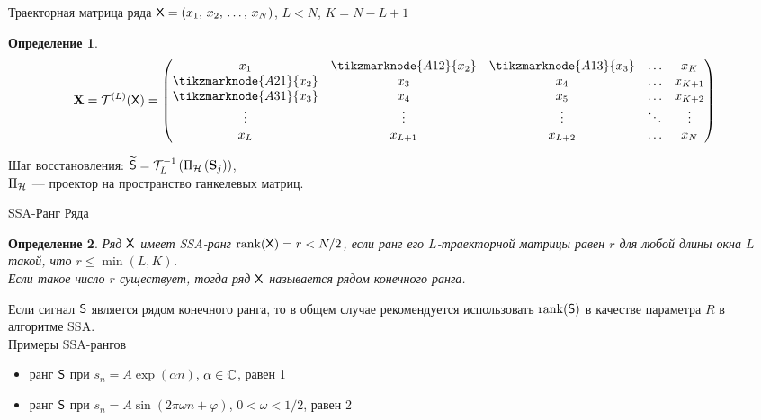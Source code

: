 \documentclass[pdf, unicode, 10pt, notheorems, handout]{beamer}
\newcommand{\rank}{\operatorname{rank}}
\newtheorem{definition}{Определение}
\begin{document}
\begin{frame}{Траекторная матрица ряда}
  $\mathsf{X} = (x_1,\, x_2,\, \dots,\, x_N)$, $L < N$, $K = N - L + 1$
  \vspace{0.4cm}\\
  \begin{definition}
    \[
      \bfX = \calT^{(L)}(\tX) =
      \begin{pmatrix}
        x_1                     & \tikzmarknode{A12}{x_2} &
        \tikzmarknode{A13}{x_3} & \ldots & x_K     \\
        \tikzmarknode{A21}{x_2} & x_3                     & x_4
        & \ldots & x_{K+1} \\
        \tikzmarknode{A31}{x_3} & x_4                     & x_5
        & \ldots & x_{K+2} \\
        \vdots                  & \vdots                  & \vdots
        & \ddots & \vdots  \\
        x_L                     & x_{L+1}                 & x_{L+2}
        & \ldots & x_N
      \end{pmatrix}
    \]
  \end{definition}
  \bigskip

  Шаг восстановления: $\widetilde{\mathsf{S}} =
  \mathcal{T}_L^{-1}\left(\Pi_{\mathcal{H}}\left(\mathbf{S}_j\right)\right)$,\\
  $\Pi_{\mathcal{H}}$ --- проектор на пространство ганкелевых матриц.
\end{frame}

\begin{frame}{SSA-Ранг Ряда}
  \begin{definition}
    Ряд $\mathsf{X}$ имеет SSA-ранг $\rank(\tX)=r < N/2$, если ранг его $L$-траекторной
    матрицы равен $r$ для любой длины окна $L$ такой, что $r
    \leqslant \min(L, K)$.\\
    Если такое число $r$ существует, тогда ряд $\mathsf{X}$ называется рядом
    конечного ранга.
  \end{definition}
  \vspace{0.5cm}
  Если сигнал $\mathsf{S}$ является рядом конечного ранга, то в общем случае
  рекомендуется использовать $\rank(\tS)$ в качестве параметра $R$ в
  алгоритме SSA.
  \vspace{0.4cm}\\
  Примеры SSA-рангов
  \begin{itemize}
    \item ранг $\mathsf{S}$ при $s_n = A \exp(\alpha n)$, $\alpha
      \in\mathbb{C}$, равен 1
    \item ранг $\mathsf{S}$ при $s_n = A\sin(2\pi \omega n + \varphi)$,
      $0 < \omega < 1/2$, равен 2
  \end{itemize}
\end{frame}
\end{document}
